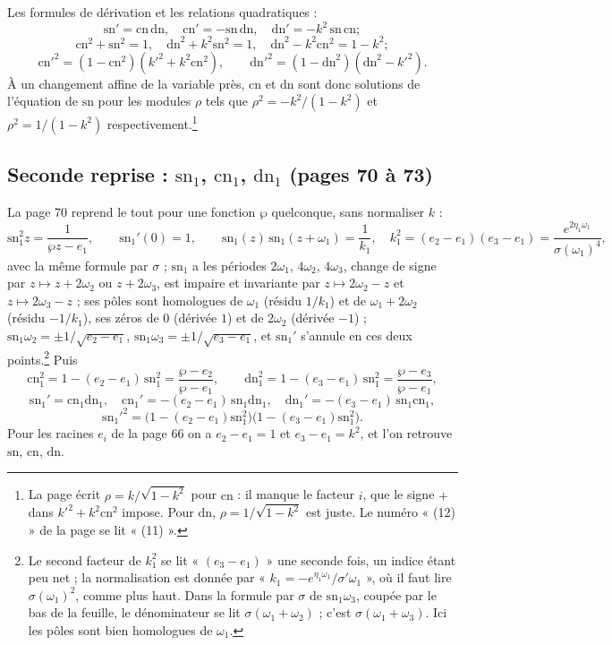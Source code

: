 \documentclass[11pt,a4paper]{article}
\begin{document}
Les formules de dérivation et les relations quadratiques :
\[
\mathrm{sn}' = \mathrm{cn}\,\mathrm{dn},\quad \mathrm{cn}' =
-\mathrm{sn}\,\mathrm{dn},\quad \mathrm{dn}' = -k^2\,\mathrm{sn}\,\mathrm{cn} ;
\]
\[
\mathrm{cn}^2 + \mathrm{sn}^2 = 1,\quad \mathrm{dn}^2 + k^2\mathrm{sn}^2 = 1,\quad
\mathrm{dn}^2 - k^2\mathrm{cn}^2 = 1 - k^2 ;
\]
\[
\mathrm{cn}'^2 = (1 - \mathrm{cn}^2)(k'^2 + k^2\mathrm{cn}^2),
\qquad
\mathrm{dn}'^2 = (1 - \mathrm{dn}^2)(\mathrm{dn}^2 - k'^2) .
\]
À un changement affine de la variable près, $\mathrm{cn}$ et $\mathrm{dn}$ sont
donc solutions de l'équation de $\mathrm{sn}$ pour les modules $\rho$ tels que
$\rho^2 = -k^2/(1-k^2)$ et $\rho^2 = 1/(1-k^2)$ respectivement.\footnote{La page
écrit $\rho = k/\sqrt{1-k^2}$ pour $\mathrm{cn}$ : il manque le facteur $i$, que
le signe $+$ dans $k'^2 + k^2\mathrm{cn}^2$ impose. Pour $\mathrm{dn}$, $\rho =
1/\sqrt{1-k^2}$ est juste. Le numéro « (12) » de la page se lit « (11) ».}

\subsection*{Seconde reprise : $\mathrm{sn}_1$, $\mathrm{cn}_1$, $\mathrm{dn}_1$ (pages 70 à 73)}

La page 70 reprend le tout pour une fonction $\wp$ quelconque, sans
normaliser $k$ :
\[
\mathrm{sn}_1^2 z = \frac{1}{\wp z - e_1}, \qquad \mathrm{sn}_1'(0) = 1,
\qquad
\mathrm{sn}_1(z)\,\mathrm{sn}_1(z + \omega_1) = \frac{1}{k_1},\quad
k_1^2 = (e_2 - e_1)(e_3 - e_1) = \frac{e^{2\eta_1\omega_1}}{\sigma(\omega_1)^4},
\]
avec la même formule par $\sigma$ ; $\mathrm{sn}_1$ a les périodes $2\omega_1$,
$4\omega_2$, $4\omega_3$, change de signe par $z \mapsto z + 2\omega_2$ ou $z
+ 2\omega_3$, est impaire et invariante par $z \mapsto 2\omega_2 - z$ et $z
\mapsto 2\omega_3 - z$ ; ses pôles sont homologues de $\omega_1$ (résidu
$1/k_1$) et de $\omega_1 + 2\omega_2$ (résidu $-1/k_1$), ses zéros de $0$
(dérivée $1$) et de $2\omega_2$ (dérivée $-1$) ; $\mathrm{sn}_1\omega_2 =
\pm 1/\sqrt{e_2 - e_1}$, $\mathrm{sn}_1\omega_3 = \pm 1/\sqrt{e_3 - e_1}$, et
$\mathrm{sn}_1'$ s'annule en ces deux points.\footnote{Le second facteur de
$k_1^2$ se lit « $(e_3 - e_1)$ » une seconde fois, un indice étant peu net ; la
normalisation est donnée par « $k_1 = -e^{\eta_1\omega_1}/\sigma'\omega_1$ », où
il faut lire $\sigma(\omega_1)^2$, comme plus haut. Dans la formule par
$\sigma$ de $\mathrm{sn}_1\omega_3$, coupée par le bas de la feuille, le
dénominateur se lit $\sigma(\omega_1 + \omega_2)$ ; c'est $\sigma(\omega_1 +
\omega_3)$. Ici les pôles sont bien homologues de $\omega_1$.} Puis
\[
\mathrm{cn}_1^2 = 1 - (e_2 - e_1)\,\mathrm{sn}_1^2 = \frac{\wp - e_2}{\wp - e_1},
\qquad
\mathrm{dn}_1^2 = 1 - (e_3 - e_1)\,\mathrm{sn}_1^2 = \frac{\wp - e_3}{\wp - e_1},
\]
\[
\mathrm{sn}_1' = \mathrm{cn}_1\mathrm{dn}_1,\quad \mathrm{cn}_1' = -(e_2 -
e_1)\,\mathrm{sn}_1\mathrm{dn}_1,\quad \mathrm{dn}_1' = -(e_3 -
e_1)\,\mathrm{sn}_1\mathrm{cn}_1,
\]
\[
\mathrm{sn}_1'^2 = \bigl(1 - (e_2 - e_1)\mathrm{sn}_1^2\bigr)\bigl(1 - (e_3 -
e_1)\mathrm{sn}_1^2\bigr).
\]
Pour les racines $e_i$ de la page 66 on a $e_2 - e_1 = 1$ et $e_3 - e_1 = k^2$, et
l'on retrouve $\mathrm{sn}$, $\mathrm{cn}$, $\mathrm{dn}$.
\end{document}
